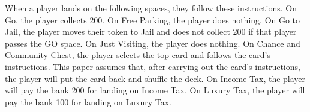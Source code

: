 When a player lands on the following spaces, they follow these instructions. On Go, the player collects 200. On Free Parking, the player does nothing. On Go to Jail, the player moves their token to Jail and does not collect 200 if that player passes the GO space. On Just Visiting, the player does nothing. On Chance and Community Chest, the player selects the top card and follows the card's instructions. This paper assumes that, after carrying out the card's instructions, the player will put the card back and shuffle the deck. On Income Tax, the player will pay the bank 200 for landing on Income Tax. On Luxury Tax, the player will pay the bank 100 for landing on Luxury Tax. 